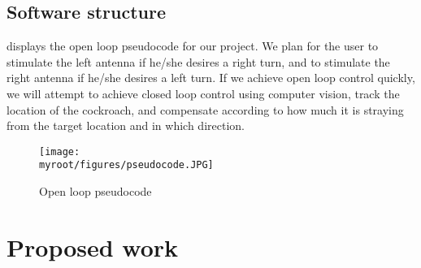 \documentclass[twocolumn,10pt]{IEEEtran}
\newcommand{\myroot}{.}
\begin{document}
\subsection{Software structure}
 displays the open loop pseudocode for our project. We plan for the user to stimulate the left antenna if he/she desires a right turn, and to stimulate the right antenna if he/she desires a left turn. If we achieve open loop control quickly, we will attempt to achieve closed loop control using computer vision, track the location of the cockroach, and compensate according to how much it is straying from the target location and in which direction.
\begin{figure}[ht!]
\centering
\texttt{[image: \\myroot/figures/pseudocode.JPG]}
\caption{Open loop pseudocode}
\label{fig:pseudocode}
\end{figure}




\section{Proposed work}
\end{document}
